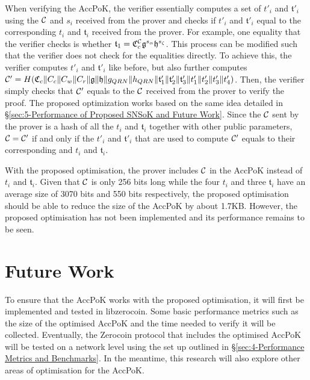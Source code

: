 When verifying the AccPoK, the verifier essentially computes a set of $t'_i$ and $\mathfrak{t}'_i$ using the $\mathcal{C}$ and $s_i$ received from the prover and checks if $t'_i$ and $\mathfrak{t}'_i$ equal to the corresponding $t_i$ and $\mathfrak{t}_i$ received from the prover. For example, one equality that the verifier checks is whether $\mathfrak{t}_1=\mathfrak{C}_c^{\mathcal{C}}\mathfrak{g}^{s_\alpha}\mathfrak{h}^{s_\zeta}$. This process can be modified such that the verifier does not check for the equalities directly. To achieve this, the verifier computes $t'_i$ and $\mathfrak{t}'_i$ like before, but also further computes $\mathcal{C}'=H(\mathfrak{C}_c \| \allowbreak C_c \| \allowbreak C_w \| \allowbreak C_r \| \allowbreak \mathfrak{g} \| \allowbreak \mathfrak{h} \| \allowbreak g_{QRN} \| \allowbreak h_{QRN} \| \allowbreak \mathfrak{t}'_1 \| \allowbreak \mathfrak{t}'_2 \| \allowbreak \mathfrak{t}'_3 \| \allowbreak t'_1 \| \allowbreak t'_2 \| \allowbreak t'_3 \| \allowbreak t'_4)$. Then, the verifier simply checks that $\mathcal{C}'$ equals to the $\mathcal{C}$ received from the prover to verify the proof. The proposed optimization works based on the same idea detailed in \S\ref{sec:5-Performance of Proposed SNSoK and Future Work}. Since the $\mathcal{C}$ sent by the prover is a hash of all the $t_i$ and $\mathfrak{t}_i$ together with other public parameters, $\mathcal{C}=\mathcal{C}'$ if and only if the $t'_i$ and $\mathfrak{t}'_i$ that are used to compute $\mathcal{C}'$ equals to their corresponding and $t_i$ and $\mathfrak{t}_i$.
 
With the proposed optimisation, the prover includes $\mathcal{C}$ in the AccPoK instead of $t_i$ and $\mathfrak{t}_i$. Given that $\mathcal{C}$ is only 256 bits long while the four $t_i$ and three $\mathfrak{t}_i$ have an average size of 3070 bits and 550 bits respectively, the proposed optimisation should be able to reduce the size of the AccPoK by about 1.7KB. However, the proposed optimisation has not been implemented and its performance remains to be seen.

\section{Future Work}
\label{sec:6-AccPoK Future Work}
To ensure that the AccPoK works with the proposed optimisation, it will first be implemented and tested in libzerocoin. Some basic performance metrics such as the size of the optimised AccPoK and the time needed to verify it will be collected. Eventually, the Zerocoin protocol that includes the optimised AccPoK will be tested on a network level using the set up outlined in \S\ref{sec:4-Performance Metrics and Benchmarks}. In the meantime, this research will also explore other areas of optimisation for the AccPoK. 
